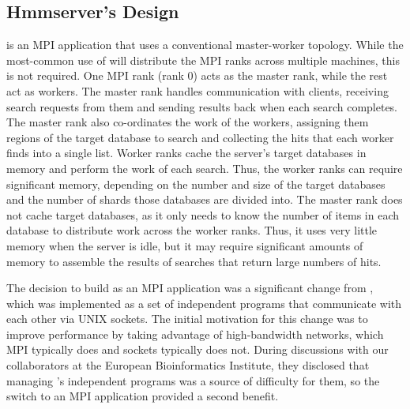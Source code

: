 \documentclass[notoc,justified,openany]{tufte-book}    %
\newcommand{\hmmserver}{\mono{hmmserver}\xspace}
\newcommand{\Hmmserver}{\mono{Hmmserver}\xspace}
\newcommand{\hmmpgmd}{\mono{hmmpgmd}\xspace}
\begin{document}
\begin{itemize}
\chapter{Hmmserver's Design}
\Hmmserver is an MPI application that uses a conventional master-worker topology.  While the most-common use of \hmmserver will distribute the MPI ranks across multiple machines, this is not required.  One MPI rank (rank 0) acts as the master rank, while the rest act as workers.  The master rank handles communication with clients, receiving search requests from them and sending results back when each search completes.  The master rank also co-ordinates the work of the workers, assigning them regions of the target database to search and collecting the hits that each worker finds into a single list.  Worker ranks cache the server's target databases in memory and perform the work of each search.  Thus, the worker ranks can require significant memory, depending on the number and size of the target databases and the number of shards those databases are divided into.  The master rank does not cache target databases, as it only needs to know the number of items in each database to distribute work across the worker ranks.  Thus, it uses very little memory when the server is idle, but it may require significant amounts of memory to assemble the results of searches that return large numbers of hits.

The decision to build \hmmserver as an MPI application was a significant change from \hmmpgmd, which was implemented as a set of independent programs that communicate with each other via UNIX sockets.  The initial motivation for this change was to improve performance by taking advantage of high-bandwidth networks, which MPI typically does and sockets typically does not.  During discussions with our collaborators at the European Bioinformatics Institute, they disclosed that managing \hmmpgmd's independent programs was a source of difficulty for them, so the switch to an MPI application provided a second benefit.


\end{itemize}
\end{document}
